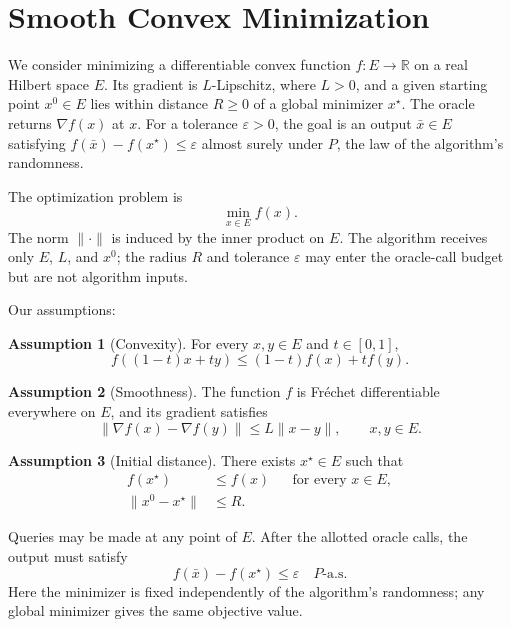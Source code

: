\documentclass[10pt]{article}
\theoremstyle{definition}
\newtheorem{assumption}{Assumption}
\begin{document}
\section*{Smooth Convex Minimization}
We consider minimizing a differentiable convex function $f:E\to\mathbb{R}$ on a real Hilbert space $E$. Its gradient is $L$-Lipschitz, where $L>0$, and a given starting point $x^0\in E$ lies within distance $R\geq 0$ of a global minimizer $x^\star$. The oracle returns $\nabla f(x)$ at $x$. For a tolerance $\varepsilon>0$, the goal is an output $\bar{x}\in E$ satisfying $f(\bar{x})-f(x^\star)\leq\varepsilon$ almost surely under $P$, the law of the algorithm's randomness.

The optimization problem is
\[
\min_{x\in E} f(x).
\]
The norm $\|\cdot\|$ is induced by the inner product on $E$. The algorithm receives only $E$, $L$, and $x^0$; the radius $R$ and tolerance $\varepsilon$ may enter the oracle-call budget but are not algorithm inputs.

Our assumptions:
\begin{assumption}[Convexity]
For every $x,y\in E$ and $t\in[0,1]$,
\[
f((1-t)x+ty)\leq (1-t)f(x)+t f(y).
\]
\end{assumption}

\begin{assumption}[Smoothness]
The function $f$ is Fr\'echet differentiable everywhere on $E$, and its gradient satisfies
\[
\|\nabla f(x)-\nabla f(y)\|\leq L\|x-y\|,
\qquad x,y\in E.
\]
\end{assumption}

\begin{assumption}[Initial distance]
There exists $x^\star\in E$ such that
\[
\begin{aligned}
f(x^\star)&\leq f(x) &&\text{for every }x\in E,\\
\|x^0-x^\star\|&\leq R.
\end{aligned}
\]
\end{assumption}

Queries may be made at any point of $E$. After the allotted oracle calls, the output must satisfy
\[
f(\bar{x})-f(x^\star)\leq\varepsilon
\quad P\text{-a.s.}
\]
Here the minimizer is fixed independently of the algorithm's randomness; any global minimizer gives the same objective value.
\end{document}
